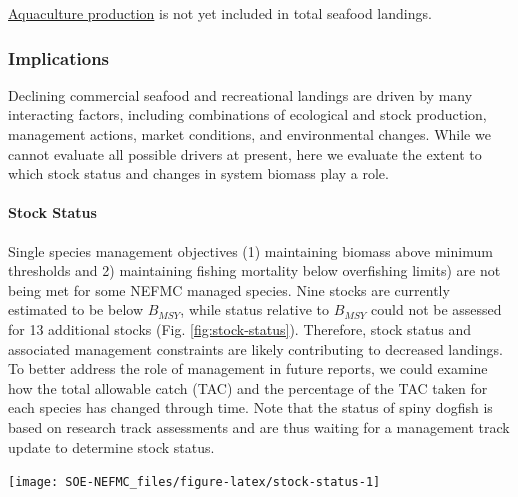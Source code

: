 \documentclass[
  10pt,
]{article}
\let\origfigure\figure
\let\endorigfigure\endfigure
\renewenvironment{figure}[1][2] {
    \expandafter\origfigure\expandafter[H]
} {
    \endorigfigure
}
\begin{document}
\href{https://noaa-edab.github.io/catalog/aquaculture-production.html}{Aquaculture production} is not yet included in total seafood landings.

\hypertarget{implications}{%
\subsubsection{Implications}\label{implications}}

Declining commercial seafood and recreational landings are driven by many interacting factors, including combinations of ecological and stock production, management actions, market conditions, and environmental changes. While we cannot evaluate all possible drivers at present, here we evaluate the extent to which stock status and changes in system biomass play a role.

\hypertarget{stock-status}{%
\paragraph{Stock Status}\label{stock-status}}

Single species management objectives (1) maintaining biomass above minimum thresholds and 2) maintaining fishing mortality below overfishing limits) are not being met for some NEFMC managed species. Nine stocks are currently estimated to be below \(B_{MSY}\), while status relative to \(B_{MSY}\) could not be assessed for 13 additional stocks (Fig. \ref{fig:stock-status}). Therefore, stock status and associated management constraints are likely contributing to decreased landings. To better address the role of management in future reports, we could examine how the total allowable catch (TAC) and the percentage of the TAC taken for each species has changed through time. Note that the status of spiny dogfish is based on research track assessments and are thus waiting for a management track update to determine stock status.

\begin{figure}

{\centering \texttt{[image: SOE-NEFMC\_files/figure-latex/stock-status-1]} 

}

\caption{Summary of single species status for NEFMC and jointly federally managed stocks (goosefish and spiny dogfish).  The dotted vertical line at one is the target biomass reference point of B\textsubscript{MSY}.  The dashed lines are the management thresholds of B\textsubscript{MSY} (vertical) or F\textsubscript{MSY} (horizontal).  Text color denotes which quadrant of the plot the stocks are in with orange text below F\textsubscript{MSY} and B\textsubscript{MSY}, green above F\textsubscript{MSY} and below B\textsubscript{MSY}, and blue above both F\textsubscript{MSY} and B\textsubscript{MSY}.}\label{fig:stock-status}
\end{figure}
\end{document}
